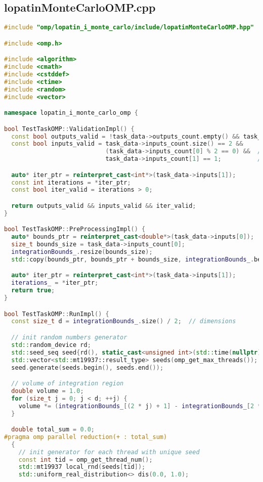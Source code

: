 \documentclass[12pt,a4paper]{extarticle}
\begin{document}
\subsection{lopatinMonteCarloOMP.cpp}
\begin{lstlisting}[language=C++]
#include "omp/lopatin_i_monte_carlo/include/lopatinMonteCarloOMP.hpp"

#include <omp.h>

#include <algorithm>
#include <cmath>
#include <cstddef>
#include <ctime>
#include <random>
#include <vector>

namespace lopatin_i_monte_carlo_omp {

bool TestTaskOMP::ValidationImpl() {
  const bool outputs_valid = !task_data->outputs_count.empty() && task_data->outputs_count[0] == 1;
  const bool inputs_valid = task_data->inputs_count.size() == 2 &&
                            (task_data->inputs_count[0] % 2 == 0) &&  // odd num of bounds
                            task_data->inputs_count[1] == 1;          // iterations num

  auto* iter_ptr = reinterpret_cast<int*>(task_data->inputs[1]);
  const int iterations = *iter_ptr;
  const bool iter_valid = iterations > 0;

  return outputs_valid && inputs_valid && iter_valid;
}

bool TestTaskOMP::PreProcessingImpl() {
  auto* bounds_ptr = reinterpret_cast<double*>(task_data->inputs[0]);
  size_t bounds_size = task_data->inputs_count[0];
  integrationBounds_.resize(bounds_size);
  std::copy(bounds_ptr, bounds_ptr + bounds_size, integrationBounds_.begin());

  auto* iter_ptr = reinterpret_cast<int*>(task_data->inputs[1]);
  iterations_ = *iter_ptr;
  return true;
}

bool TestTaskOMP::RunImpl() {
  const size_t d = integrationBounds_.size() / 2;  // dimensions

  // init random numbers generator
  std::random_device rd;
  std::seed_seq seed{rd(), static_cast<unsigned int>(std::time(nullptr))};
  std::vector<std::mt19937::result_type> seeds(omp_get_max_threads());
  seed.generate(seeds.begin(), seeds.end());

  // volume of integration region
  double volume = 1.0;
  for (size_t j = 0; j < d; ++j) {
    volume *= (integrationBounds_[(2 * j) + 1] - integrationBounds_[2 * j]);
  }

  double total_sum = 0.0;
#pragma omp parallel reduction(+ : total_sum)
  {
    // init generator for each thread with unique seed
    const int tid = omp_get_thread_num();
    std::mt19937 local_rnd(seeds[tid]);
    std::uniform_real_distribution<> dis(0.0, 1.0);


\end{lstlisting}
\end{document}

